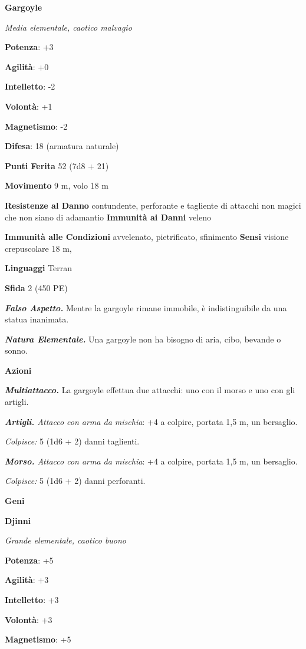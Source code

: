 \begin{multicols}{2}
\textbf{Gargoyle}

\emph{Media elementale, caotico malvagio}

\textbf{Potenza}: +3

\textbf{Agilità}: +0

\textbf{Intelletto}: -2

\textbf{Volontà}: +1

\textbf{Magnetismo}: -2

\textbf{Difesa}: 18 (armatura naturale)

\textbf{Punti Ferita} 52 (7d8 + 21)

\textbf{Movimento} 9 m, volo 18 m

\textbf{Resistenze al Danno} contundente, perforante e tagliente di
attacchi non magici che non siano di adamantio \textbf{Immunità ai
Danni} veleno

\textbf{Immunità alle Condizioni} avvelenato, pietrificato, sfinimento
\textbf{Sensi} visione crepuscolare 18 m, 

\textbf{Linguaggi} Terran

\textbf{Sfida} 2 (450 PE)

\emph{\textbf{Falso Aspetto.}} Mentre la gargoyle rimane immobile, è
indistinguibile da una statua inanimata.

\emph{\textbf{Natura Elementale.}} Una gargoyle non ha bisogno di aria,
cibo, bevande o sonno.

\textbf{Azioni}

\emph{\textbf{Multiattacco.}} La gargoyle effettua due attacchi: uno con
il morso e uno con gli artigli.

\emph{\textbf{Artigli.} Attacco con arma da mischia}: +4 a colpire,
portata 1,5 m, un bersaglio.

\emph{Colpisce:} 5 (1d6 + 2) danni taglienti.

\emph{\textbf{Morso.} Attacco con arma da mischia}: +4 a colpire,
portata 1,5 m, un bersaglio.

\emph{Colpisce:} 5 (1d6 + 2) danni perforanti.



\textbf{Geni}

\textbf{Djinni}

\emph{Grande elementale, caotico buono}

\textbf{Potenza}: +5

\textbf{Agilità}: +3

\textbf{Intelletto}: +3

\textbf{Volontà}: +3

\textbf{Magnetismo}: +5


\end{multicols}

